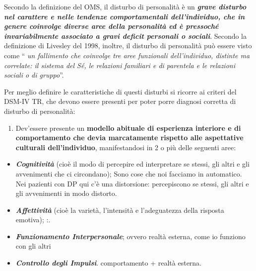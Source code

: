 \documentclass[]{article}
\begin{document}
Secondo la definizione del OMS, il disturbo di personalità è un
\textbf{\emph{grave disturbo nel carattere e nelle tendenze
comportamentali dell'individuo, che in genere coinvolge diverse aree
della personalità ed è pressoché invariabilmente associato a gravi
deficit personali o sociali}}. Secondo la definizione di Livesley del
1998, inoltre, il disturbo di personalità può essere visto come ``
\emph{un fallimento che coinvolge tre aree funzionali dell'individuo,
distinte ma correlate: il sistema del Sé, le relazioni familiari e di
parentela e le relazioni sociali o di gruppo}''.

Per meglio definire le caratteristiche di questi disturbi si ricorre ai
criteri del DSM-IV TR, che devono essere presenti per poter porre
diagnosi corretta di disturbo di personalità:

\begin{enumerate}
\def\labelenumi{\arabic{enumi}.}
\item
  Dev'essere presente un \textbf{modello abituale di esperienza
  interiore e di comportamento che devia marcatamente rispetto alle
  aspettative culturali dell'individuo}, manifestandosi in 2 o più delle
  seguenti aree:
\end{enumerate}

\begin{itemize}
\item
  \textbf{\emph{Cognitività}} (cioè il modo di percepire ed interpretare
  se stessi, gli altri e gli avvenimenti che ci circondano); Sono cose
  che noi facciamo in automatico. Nei pazienti con DP qui c'è una
  distorsione: percepiscono se stessi, gli altri e gli avvenimenti in
  modo distorto.
\item
  \textbf{\emph{Affettività}} (cioè la varietà, l'intensità e
  l'adeguatezza della risposta emotiva); :.
\item
  \textbf{\emph{Funzionamento Interpersonale}}; ovvero realtà esterna,
  come io funziono con gli altri
\item
  \textbf{\emph{Controllo degli Impulsi}}. comportamento + realtà
  esterna.
\end{itemize}
\end{document}
